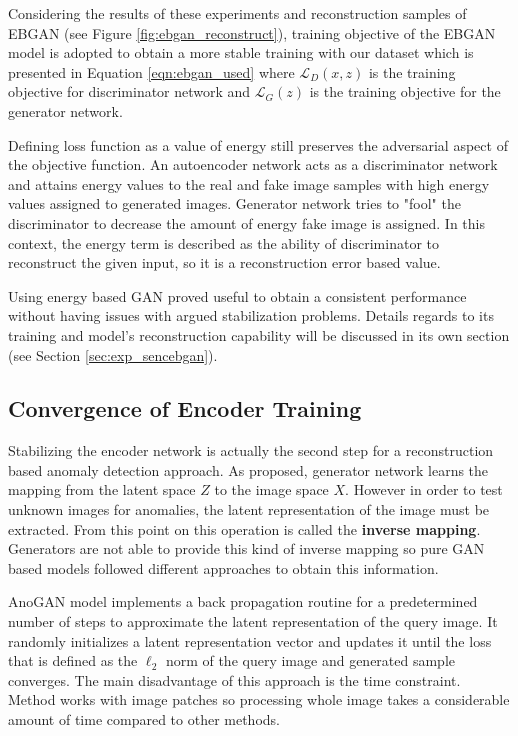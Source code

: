Considering the results of these experiments and reconstruction samples of EBGAN (see Figure \ref{fig:ebgan_reconstruct}), training objective of the EBGAN model is adopted to
obtain a more stable training with our dataset which is presented in Equation \ref{eqn:ebgan_used} where 
$\mathcal{L}_{D}(x, z)$ is the training objective for discriminator network and $\mathcal{L}_{G}(z)$ is the 
training objective for the generator network.

Defining loss function as a value of energy still preserves the adversarial aspect of the objective
function. An autoencoder network acts as a discriminator network and attains energy values to the real
and fake image samples with high energy values assigned to generated images. Generator network tries to
"fool" the discriminator to decrease the amount of energy fake image is assigned. In this context, the energy
term is described as the ability of discriminator to reconstruct the given input, so it is a
reconstruction error based value. 

Using energy based GAN proved useful to obtain a consistent performance without having issues with
argued stabilization problems. Details regards to its training and model's reconstruction capability
will be discussed in its own section (see Section \ref{sec:exp_sencebgan}).

\subsection{Convergence of Encoder Training}
\label{sec:conv_enc}

Stabilizing the encoder network is actually the second step for a reconstruction based anomaly
detection approach. As proposed, generator network learns the mapping from the latent space $Z$ to
the image space $X$. However in order to test unknown images for anomalies, the latent
representation of the image must be extracted. From this point on this operation is called the
\textbf{inverse mapping}. Generators are not able to provide this kind of inverse mapping so pure GAN based
models followed different approaches to obtain this information.

AnoGAN model implements a back propagation routine for a predetermined number of steps to approximate
the latent representation of the query image. It randomly initializes a latent representation vector
and updates it until the loss that is defined as the $\ell_{2}$ norm of the query image and
generated sample converges. The main disadvantage of this approach is the time constraint. Method
works with image patches so processing whole image takes a considerable amount of time compared to
other methods.

